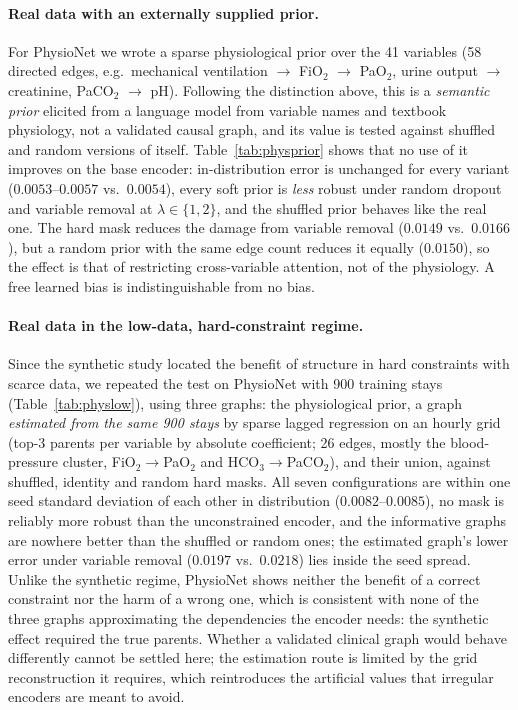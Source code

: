 \documentclass[sigconf,nonacm]{acmart}
\begin{document}
\paragraph{Real data with an externally supplied prior.}
For PhysioNet we wrote a sparse physiological prior over the 41 variables (58 directed edges, e.g.\ mechanical
ventilation $\to$ FiO$_2$ $\to$ PaO$_2$, urine output $\to$ creatinine, PaCO$_2$ $\to$ pH). Following the
distinction above, this is a \emph{semantic prior} elicited from a language model from variable names and
textbook physiology, not a validated causal graph, and its value is tested against shuffled and random versions
of itself. Table~\ref{tab:physprior} shows that no use of it improves on the base encoder: in-distribution error is
unchanged for every variant ($0.0053$--$0.0057$ vs.\ $0.0054$), every soft prior is \emph{less} robust under
random dropout and variable removal at $\lambda\in\{1,2\}$, and the shuffled prior behaves like the real one. The
hard mask reduces the damage from variable removal ($0.0149$ vs.\ $0.0166$), but a random prior with the same
edge count reduces it equally ($0.0150$), so the effect is that of restricting cross-variable attention, not of the
physiology. A free learned bias is indistinguishable from no bias.

\paragraph{Real data in the low-data, hard-constraint regime.}
Since the synthetic study located the benefit of structure in hard constraints with scarce data, we repeated the
test on PhysioNet with 900 training stays (Table~\ref{tab:physlow}), using three graphs: the physiological prior,
a graph \emph{estimated from the same 900 stays} by sparse lagged regression on an hourly grid (top-3 parents per
variable by absolute coefficient; 26 edges, mostly the blood-pressure cluster, FiO$_2\to$PaO$_2$ and
HCO$_3\to$PaCO$_2$), and their union, against shuffled, identity and random hard masks. All seven configurations
are within one seed standard deviation of each other in distribution ($0.0082$--$0.0085$), no mask is reliably
more robust than the unconstrained encoder, and the informative graphs are nowhere better than the shuffled or
random ones; the estimated graph's lower error under variable removal ($0.0197$ vs.\ $0.0218$) lies inside the
seed spread. Unlike the synthetic regime, PhysioNet shows neither the benefit of a correct constraint nor the harm
of a wrong one, which is consistent with none of the three graphs approximating the dependencies the encoder
needs: the synthetic effect required the true parents. Whether a validated clinical graph would behave differently
cannot be settled here; the estimation route is limited by the grid reconstruction it requires, which
reintroduces the artificial values that irregular encoders are meant to avoid.
\end{document}
